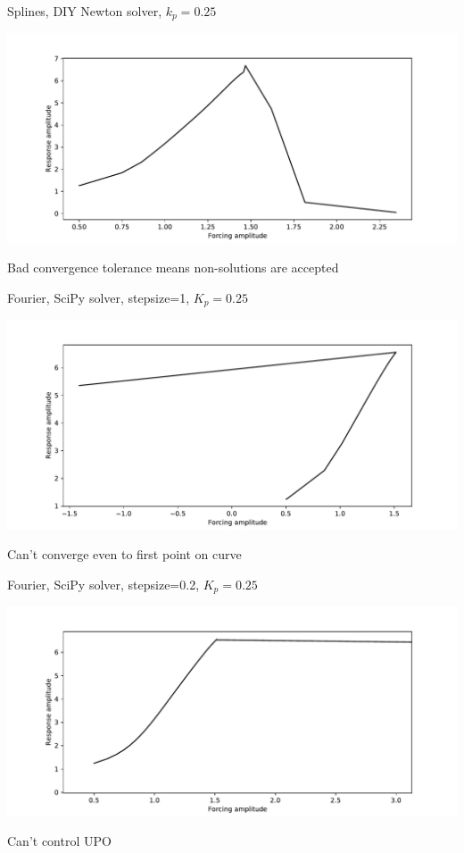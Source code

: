 \documentclass[presentation]{beamer}
\begin{document}
\begin{frame}[label={sec:org559b66d}]{Splines, DIY Newton solver, \(k_p=0.25\)}
\begin{center}
\includegraphics[width=.9\linewidth]{./kp0d25_transtime100_newton.pdf}
\end{center}

Bad convergence tolerance means non-solutions are accepted
\end{frame}

\begin{frame}[label={sec:orgabcffb8}]{Fourier, SciPy solver, stepsize=1, \(K_p=0.25\)}
\begin{center}
\includegraphics[width=.9\linewidth]{./kp0d25_transtime100_scipy_fourier.pdf}
\end{center}

Can't converge even to first point on curve
\end{frame}

\begin{frame}[label={sec:orgd3c0327}]{Fourier, SciPy solver, stepsize=0.2, \(K_p=0.25\)}
\begin{center}
\includegraphics[width=.9\linewidth]{./kp0d25_transtime100_scipy_fourier_ss0d2.pdf}
\end{center}

Can't control UPO
\end{frame}
\end{document}
